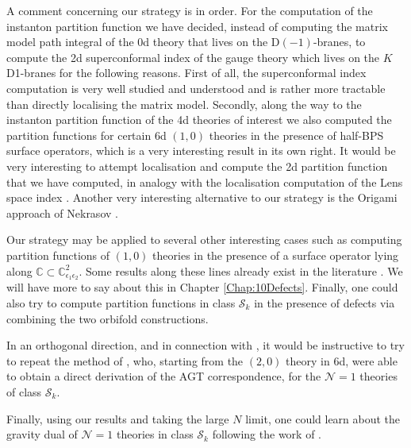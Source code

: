 \documentclass[main.tex]{subfiles}
\begin{document}
A comment concerning our strategy is in order.
For the computation of the instanton partition function we have decided, instead of computing the matrix model path integral of the 0d theory that lives on the D$(-1)$-branes, to compute the 2d superconformal index of the gauge theory which lives on the $K$ D1-branes for the following reasons.
First of all, the superconformal index computation is very well studied and understood and is rather more tractable than directly localising the matrix model. Secondly,
 along the way to the instanton partition function of the 4d theories of interest we also computed the partition functions for certain 6d $(1,0)$ theories in the presence of half-BPS surface operators, which is a very interesting result in its own right. 
 It would be very interesting to attempt localisation and compute the 2d partition function that we have computed, in analogy with the localisation computation of the Lens space index \cite{Benini:2011nc,Alday:2013rs}. Another very interesting alternative to our strategy is the Origami approach of Nekrasov \cite{Nekrasov:2016ydq}. 
 
Our strategy may be applied to several other interesting cases such as computing partition functions of $(1,0)$ theories in the presence of a surface operator lying along $\mathbb{C}\subset\mathbb{C}^2_{\epsilon_1\epsilon_2}$. 
Some results along these lines already exist in the literature \cite{Kanno:2011fw,Pan:2016fbl,LeFloch:2017lbt,Gorsky:2017hro,Bawane:2017gjf}. We will have more to say about this in Chapter \ref{Chap:10Defects}.
Finally, one could also try to compute partition functions in class $\mathcal{S}_k$ in the presence of defects via combining the two orbifold constructions.

In an orthogonal direction, and in connection with \cite{Mitev:2017jqj}, it would be instructive to try to repeat  the method of \cite{Cordova:2016cmu}, who, starting from the $(2,0)$ theory in 6d, were able to obtain a direct derivation of the AGT correspondence,
for the $\mathcal{N}=1$ theories of class $\mathcal{S}_k$.

Finally, using our results and taking the large $N$ limit, one could learn about the gravity dual of $\mathcal{N}=1$ theories in class $\mathcal{S}_k$ following the work of \cite{Dorey:1999pd,Hollowood:1999bm}.
\end{document}
